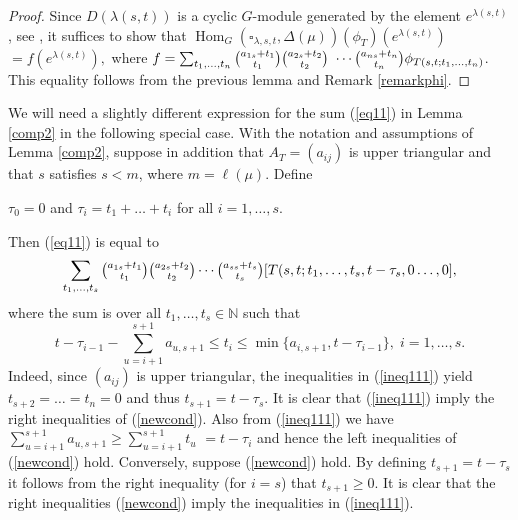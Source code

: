\documentclass[ALCO,Unicode]{cedram}
\newcommand{\la}{\lambda}
\DeclareMathOperator{\Hom}{Hom}
\numberwithin{equation}{section}
\begin{document}
\begin{proof}
	Since $D(\la(s,t))$ is a cyclic $G$-module generated by the element $e^{\la(s,t)}$,  see \cite[Theorem A4]{SY}, it suffices to show that $\Hom_G(\square_{\la, s, t},\Delta({\mu}))(\phi_T)(e^{\la(s,t)})$$=f(e^{\la(s,t)}),$ where $f=\sum_{t_1,\dots,t_{n}}\tbinom{a_{1s}+t_1}{t_1}\tbinom{a_{2s}+t_2}{t_2} $ $\cdots \tbinom{a_{ns}+t_n}{t_n}\phi_{T(s,t;t_1,\dots,t_{n})}$. This equality follows from the previous lemma and Remark \ref{remarkphi}.
\end{proof}

\begin{rema}\label{remnewcond}	We will need a slightly different expression for the sum (\ref{eq11}) in Lemma \ref{comp2} in the following special case. With the notation and assumptions of Lemma \ref{comp2}, suppose in addition that $A_T=(a_{ij})$ is upper triangular and that $s$ satisfies $s<m$, where $m =\ell(\mu)$. Define \begin{center}
		$\tau_0=0$ and $\tau_i=t_1+\dots+t_i$ for all $i=1,\dots,s.$
	\end{center} Then (\ref{eq11}) is equal to  
	\begin{equation}\label{newsum}
		\sum_{t_1,\dots,t_{s}}\tbinom{a_{1s}+t_1}{t_1}\tbinom{a_{2s}+t_2}{t_2} \cdots \tbinom{a_{ss}+t_s}{t_s}[T(s,t;t_1,\dots,t_{s},t-\tau_s,0\dots,0],\end{equation} where the sum is over all $t_1,\dots,t_s \in \mathbb{N}$ such that 
	\begin{equation}\label{newcond}
		t-\tau_{i-1}-\sum_{u=i+1}^{s+1}a_{u,s+1} \le t_i \le \min\{a_{i,s+1}, t-\tau_{i-1}\}, \; i=1,\dots,s.
	\end{equation}
	Indeed, since $(a_{ij})$ is upper triangular, the inequalities in (\ref{ineq111}) yield $t_{s+2}=\dots=t_n=0$ and thus $t_{s+1}=t-\tau_{s}$. It is clear that (\ref{ineq111}) imply the right inequalities of (\ref{newcond}). Also from (\ref{ineq111}) we have $\sum_{u=i+1}^{s+1}a_{u,s+1} \ge \sum_{u=i+1}^{s+1}t_{u}$ $=t-\tau_i$ and hence the left inequalities of (\ref{newcond}) hold. Conversely, suppose (\ref{newcond}) hold. By defining $t_{s+1}=t-\tau_s$ it follows from the right inequality (for $i=s$) that $t_{s+1} \ge 0$. It is clear that the right inequalities (\ref{newcond}) imply the inequalities in (\ref{ineq111}).
	\end{rema} 
\end{document}

